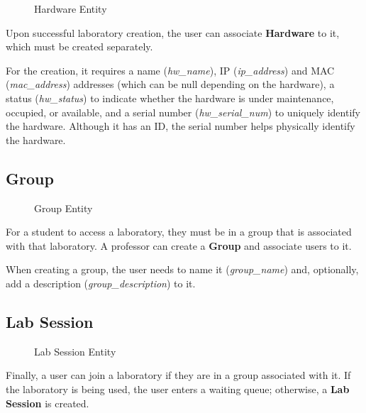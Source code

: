\begin{figure}[H]
    \centering
    
    \caption{Hardware Entity}
    \label{fig:hardware_entity}
\end{figure}

Upon successful laboratory creation, the user can associate \textbf{Hardware} to it, which must be created separately.

For the creation, it requires a name (\textit{hw\_name}), IP (\textit{ip\_address}) and MAC (\textit{mac\_address}) addresses (which can be null depending on the hardware), a status (\textit{hw\_status}) to indicate whether the hardware is under maintenance, occupied, or available, and a serial number (\textit{hw\_serial\_num}) to uniquely identify the hardware. Although it has an ID, the serial number helps physically identify the hardware.    

\subsection*{Group}

\begin{figure}[H]
    \centering
    
    \caption{Group Entity}
    \label{fig:group_entity}
\end{figure}

For a student to access a laboratory, they must be in a group that is associated with that laboratory. A professor can create a \textbf{Group} and associate users to it.

When creating a group, the user needs to name it (\textit{group\_name}) and, optionally, add a description (\textit{group\_description}) to it.

\subsection*{Lab Session}

\begin{figure}[H]
    \centering
    
    \caption{Lab Session Entity}
    \label{fig:lab_session_entity}
\end{figure}

Finally, a user can join a laboratory if they are in a group associated with it. If the laboratory is being used, the user enters a waiting queue; otherwise, a \textbf{Lab Session} is created.

